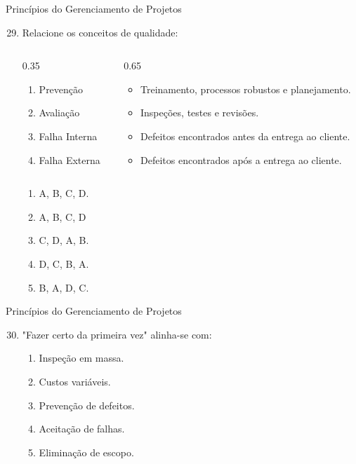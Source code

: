 \documentclass{beamer}
\begin{document}
\begin{frame}{Princípios do Gerenciamento de Projetos}
	\begin{enumerate}
		\setcounter{enumi}{28}
		\justifying
		\item Relacione os conceitos de qualidade:
		\begin{columns}
			\begin{column}{0.35\textwidth}
				\begin{enumerate}[A]
					\item Prevenção
					\item Avaliação
					\item Falha Interna
					\item Falha Externa
				\end{enumerate}
			\end{column}
			\begin{column}{0.65\textwidth}
				\begin{itemize}
					\item Treinamento, processos robustos e planejamento.
					\item Inspeções, testes e revisões.
					\item Defeitos encontrados antes da entrega ao cliente.
					\item Defeitos encontrados após a entrega ao cliente.
				\end{itemize}
			\end{column}
		\end{columns}
		\begin{enumerate}[a]
			\item A, B, C, D.
			\item \alert<2>{A, B, C, D}
			\item C, D, A, B.
			\item D, C, B, A.
			\item B, A, D, C.
		\end{enumerate}
	\end{enumerate}
\end{frame}

\begin{frame}{Princípios do Gerenciamento de Projetos}
	\begin{enumerate}
		\setcounter{enumi}{29}
		\justifying
		\item "Fazer certo da primeira vez" alinha-se com:
		\begin{enumerate}[a]
			\item Inspeção em massa.
			\item Custos variáveis.
			\item \alert<2>{Prevenção de defeitos.}
			\item Aceitação de falhas.
			\item Eliminação de escopo.
		\end{enumerate}
	\end{enumerate}
\end{frame}
\end{document}
